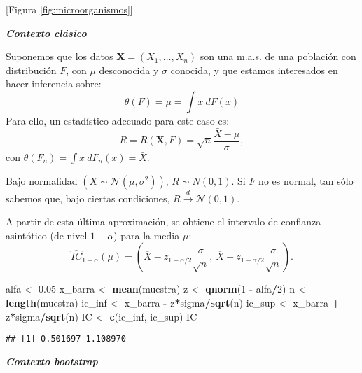 \documentclass[
]{book}
\newenvironment{Shaded}{\begin{snugshade}}{\end{snugshade}}
\newcommand{\DecValTok}[1]{\textcolor[rgb]{0.00,0.00,0.81}{#1}}
\newcommand{\FloatTok}[1]{\textcolor[rgb]{0.00,0.00,0.81}{#1}}
\newcommand{\KeywordTok}[1]{\textcolor[rgb]{0.13,0.29,0.53}{\textbf{#1}}}
\newcommand{\NormalTok}[1]{#1}
\newcommand{\OperatorTok}[1]{\textcolor[rgb]{0.81,0.36,0.00}{\textbf{#1}}}
\newcommand{\StringTok}[1]{\textcolor[rgb]{0.31,0.60,0.02}{#1}}
\theoremstyle{definition}
\theoremstyle{definition}
\theoremstyle{definition}
\theoremstyle{remark}
\begin{document}
{[}Figura \ref{fig:microorganismos}{]}

\textbf{\emph{Contexto clásico}}

Suponemos que los datos \(\mathbf{X}=\left( X_1,\ldots ,X_n \right)\) son una m.a.s.
de una población con distribución \(F\), con \(\mu\) desconocida y \(\sigma\) conocida,
y que estamos interesados en hacer inferencia sobre:
\[\theta \left( F \right) =\mu =\int x~dF\left( x \right)\]
Para ello, un estadístico adecuado para este caso es:
\[R=R\left( \mathbf{X},F \right) =\sqrt{n}\frac{\bar{X}-\mu }{\sigma},\]
con \(\theta \left( F_n \right) =\int x~dF_n\left( x \right) = \bar{X}\).

Bajo normalidad \(\left( X\sim \mathcal{N}\left( \mu ,\sigma^2 \right) \right)\),
\(R\sim N\left( 0,1 \right)\). Si \(F\) no es normal, tan sólo sabemos que,
bajo ciertas condiciones,
\(R\overset{d}{\rightarrow }\mathcal{N}\left( 0, 1 \right)\).

A partir de esta última aproximación, se obtiene el intervalo de
confianza asintótico (de nivel \(1-\alpha\)) para la media \(\mu\):
\[\hat{IC}_{1-\alpha}\left(  \mu\right)  = 
\left(  \overline{X}-z_{1-\alpha/2}\dfrac{\sigma}{\sqrt{n}},\ \overline{X} 
+ z_{1-\alpha/2}\dfrac{\sigma}{\sqrt{n}} \right).\]

\begin{Shaded}
\begin{Highlighting}[]
\NormalTok{alfa <-}\StringTok{ }\FloatTok{0.05}
\NormalTok{x_barra <-}\StringTok{ }\KeywordTok{mean}\NormalTok{(muestra)}
\NormalTok{z <-}\StringTok{ }\KeywordTok{qnorm}\NormalTok{(}\DecValTok{1} \OperatorTok{-}\StringTok{ }\NormalTok{alfa}\OperatorTok{/}\DecValTok{2}\NormalTok{)}
\NormalTok{n <-}\StringTok{ }\KeywordTok{length}\NormalTok{(muestra)}
\NormalTok{ic_inf <-}\StringTok{ }\NormalTok{x_barra }\OperatorTok{-}\StringTok{ }\NormalTok{z}\OperatorTok{*}\NormalTok{sigma}\OperatorTok{/}\KeywordTok{sqrt}\NormalTok{(n)}
\NormalTok{ic_sup <-}\StringTok{ }\NormalTok{x_barra }\OperatorTok{+}\StringTok{ }\NormalTok{z}\OperatorTok{*}\NormalTok{sigma}\OperatorTok{/}\KeywordTok{sqrt}\NormalTok{(n)}
\NormalTok{IC <-}\StringTok{ }\KeywordTok{c}\NormalTok{(ic_inf, ic_sup)}
\NormalTok{IC}
\end{Highlighting}
\end{Shaded}

\begin{verbatim}
## [1] 0.501697 1.108970
\end{verbatim}

\textbf{\emph{Contexto bootstrap}}
\end{document}
